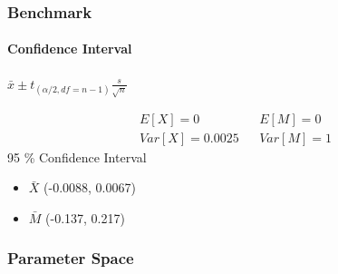 \begin{frame}
    \frametitle{Benchmark}
	\framesubtitle{Confidence Interval}
\begin{center}
	$\bar{x} \pm t_{(\alpha /2, df=n-1)} \frac{s}{\sqrt{n}}$
\end{center}
\begin{eqnarray*}
	E[X] = 0 && E[M] = 0 \\
	Var[X] = 0.0025  && Var[M] = 1
\end{eqnarray*}
95 \% Confidence Interval
\begin{itemize}
	\item $\bar{X}$ (-0.0088, 0.0067)
	\item $\bar{M}$ (-0.137, 0.217)
\end{itemize}
\end{frame}


\begin{frame}
    \frametitle{Parameter Space}
\end{frame}



